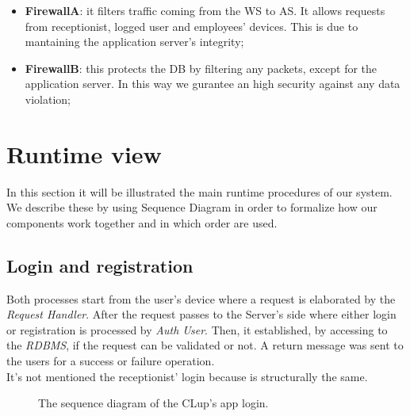\begin{itemize}

\item \textbf{FirewallA}: it filters traffic coming from the WS to AS. It allows requests from receptionist, logged user and employees' devices. This is due to mantaining the application server's integrity;

\item \textbf{FirewallB}: this protects the DB by filtering any packets, except for the application server. In this way we gurantee an high security against any data violation; 
\end{itemize}

\bigskip
\bigskip
\bigskip
\bigskip

\section{Runtime view}
In this section it will be illustrated the main runtime procedures of our system. We describe these by using Sequence Diagram in order to formalize how our components work together and in which order are used.

\pagebreak


\subsection{Login and registration}

Both processes start from the user's device where a request is elaborated by the \textit{Request Handler}. After the request passes to the Server's side where either login or registration is processed by \textit{Auth User}. Then, it established, by accessing to the \textit{RDBMS}, if the request can be validated or not. A return message was sent to the users for a success or failure operation. \\
It's not mentioned the receptionist' login because is structurally the same.



\begin{figure}[H]
  \label{LoginSD}
  \centering
    \caption{The sequence diagram of the CLup's app login.}
\end{figure} 



